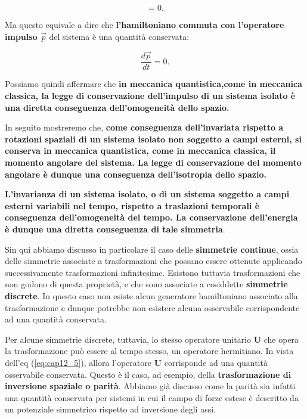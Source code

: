 \documentclass[a4paper,12pt,oneside]{book}
\begin{document}
\begin{equation}
[H,T (d\vec{x}^{'})]=0.
\end{equation}

Ma questo equivale a dire che \textbf{l'hamiltoniano commuta con l'operatore impulso $\vec{p}$} del sistema è una quantità conservata:

\begin{equation}
\frac{d\vec{p}}{dt}=0.
\end{equation}

Possiamo quindi affermare che \textbf{in meccanica quantistica,come in meccanica classica, la legge di conservazione dell'impulso di un sistema isolato è una diretta conseguenza dell'omogeneità dello spazio.}

In seguito mostreremo che, \textbf{come conseguenza dell'invariata rispetto a rotazioni spaziali di un sistema isolato non soggetto a campi esterni, si conserva in meccanica quantistica, come in meccanica classica, il momento angolare del sistema. La legge di conservazione del momento angolare è dunque una conseguenza dell'isotropia dello spazio.}

\textbf{L'invarianza di un sistema isolato, o di un sistema soggetto a campi esterni variabili nel tempo, rispetto a traslazioni temporali è conseguenza dell'omogeneità del tempo. La conservazione dell'energia è dunque una diretta conseguenza di tale simmetria}.

Sin qui abbiamo discusso in particolare il caso delle \textbf{simmetrie continue}, ossia delle simmetrie associate a trasformazioni che possano essere ottenute applicando successivamente trasformazioni infinitesime.
Esistono tuttavia trasformazioni che non godono di questa proprietà, e che sono associate a cosiddette \textbf{simmetrie discrete}. In questo caso non esiste alcun generatore hamiltoniano associato alla trasformazione e dunque potrebbe non esistere alcuna osservabile corrispondente ad una quantità conservata.

Per alcune simmetrie discrete, tuttavia, lo stesso operatore unitario \textbf{U} che opera la trasformazione può essere al tempo stesso, un operatore hermitiano. In vista dell'eq (\ref{eq:cap12_5}), allora l'operatore \textbf{U} corrisponde ad una quantità osservabile conservata. Questo è il caso, ad esempio, della \textbf{trasformazione di inversione spaziale o parità}. Abbiamo già discusso come la parità sia infatti una quantità conservata per sistemi in cui il campo di forze estese è descritto da un potenziale simmetrico rispetto ad inversione degli assi.
\end{document}

